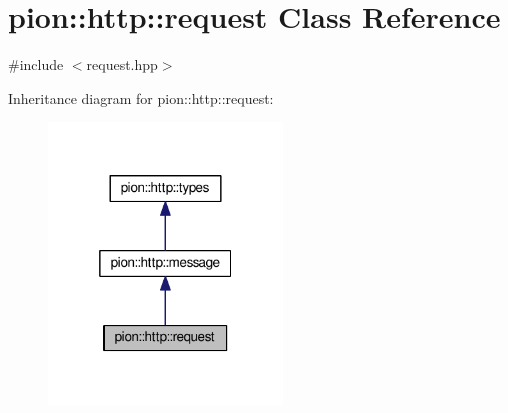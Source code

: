 \hypertarget{classpion_1_1http_1_1request}{\section{pion\-:\-:http\-:\-:request Class Reference}
\label{classpion_1_1http_1_1request}
}


{\ttfamily \#include $<$request.\-hpp$>$}



Inheritance diagram for pion\-:\-:http\-:\-:request\-:
\nopagebreak
\begin{figure}[H]
\begin{center}
\leavevmode
\includegraphics[width=176pt]{classpion_1_1http_1_1request__inherit__graph}
\end{center}
\end{figure}



